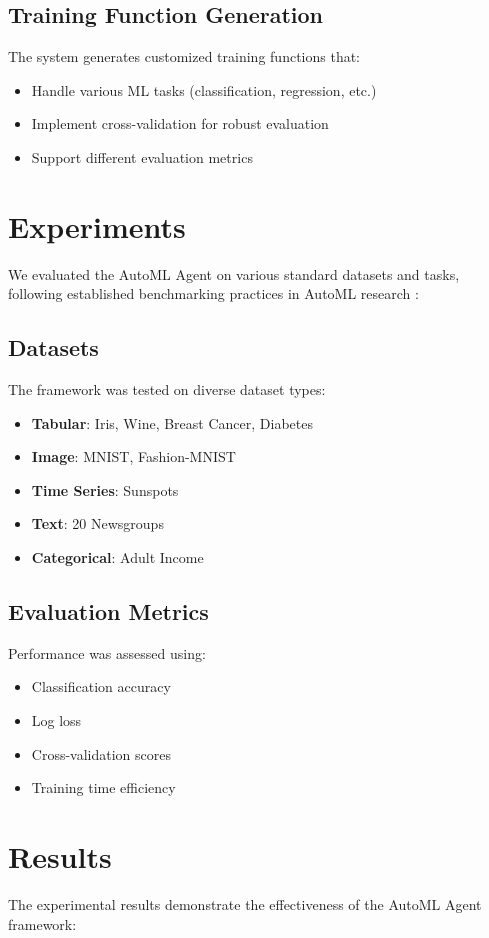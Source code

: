 \documentclass[11pt]{article}
\begin{document}
\subsection{Training Function Generation}
The system generates customized training functions that:
\begin{itemize}
    \item Handle various ML tasks (classification, regression, etc.)
    \item Implement cross-validation for robust evaluation
    \item Support different evaluation metrics
\end{itemize}

\section{Experiments}
We evaluated the AutoML Agent on various standard datasets and tasks, following established benchmarking practices in AutoML research \cite{He_2021}:

\subsection{Datasets}
The framework was tested on diverse dataset types:
\begin{itemize}
    \item \textbf{Tabular}: Iris, Wine, Breast Cancer, Diabetes
    \item \textbf{Image}: MNIST, Fashion-MNIST
    \item \textbf{Time Series}: Sunspots
    \item \textbf{Text}: 20 Newsgroups
    \item \textbf{Categorical}: Adult Income
\end{itemize}

\subsection{Evaluation Metrics}
Performance was assessed using:
\begin{itemize}
    \item Classification accuracy
    \item Log loss
    \item Cross-validation scores
    \item Training time efficiency
\end{itemize}

\section{Results}
The experimental results demonstrate the effectiveness of the AutoML Agent framework:
\end{document}
